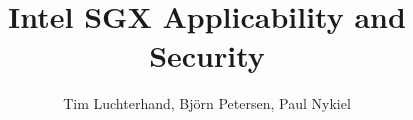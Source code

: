 \documentclass[vspaper,language=english]{acmart} %
\begin{document}
\title{Intel SGX Applicability and Security}

\author{Tim Luchterhand, Björn Petersen, Paul Nykiel} 

\begin{abstract}
    
\end{abstract}
\maketitle
{}




\appendix
{}

\nocite{*}

\end{document}
